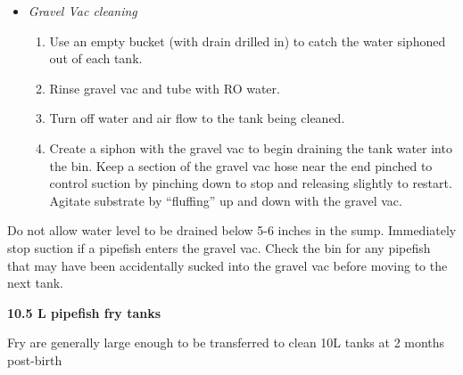 \documentclass[
  letterpaper,
  DIV=11,
  numbers=noendperiod]{scrreprt}
\providecommand{\tightlist}{%
  \setlength{\itemsep}{0pt}\setlength{\parskip}{0pt}}\usepackage{longtable,booktabs,array}
\begin{document}
\begin{itemize}
\item
  \emph{Gravel Vac cleaning}

  \begin{enumerate}
  \def\labelenumi{\arabic{enumi}.}
  \tightlist
  \item
    Use an empty bucket (with drain drilled in) to catch the water
    siphoned out of each tank.
  \item
    Rinse gravel vac and tube with RO water.
  \item
    Turn off water and air flow to the tank being cleaned.
  \item
    Create a siphon with the gravel vac to begin draining the tank water
    into the bin. Keep a section of the gravel vac hose near the end
    pinched to control suction by pinching down to stop and releasing
    slightly to restart. Agitate substrate by ``fluffing'' up and down
    with the gravel vac.
  \end{enumerate}
\end{itemize}

\begin{tcolorbox}[enhanced jigsaw, rightrule=.15mm, title=\textcolor{quarto-callout-warning-color}{\faExclamationTriangle}\hspace{0.5em}{CAUTION}, titlerule=0mm, opacitybacktitle=0.6, toprule=.15mm, bottomrule=.15mm, opacityback=0, left=2mm, colframe=quarto-callout-warning-color-frame, breakable, coltitle=black, colback=white, colbacktitle=quarto-callout-warning-color!10!white, bottomtitle=1mm, leftrule=.75mm, toptitle=1mm, arc=.35mm]

Do not allow water level to be drained below 5-6 inches in the sump.
Immediately stop suction if a pipefish enters the gravel vac. Check the
bin for any pipefish that may have been accidentally sucked into the
gravel vac before moving to the next tank.

\end{tcolorbox}

\textbf{10.5 L pipefish fry tanks}

\begin{tcolorbox}[enhanced jigsaw, rightrule=.15mm, title=\textcolor{quarto-callout-note-color}{\faInfo}\hspace{0.5em}{NOTE}, titlerule=0mm, opacitybacktitle=0.6, toprule=.15mm, bottomrule=.15mm, opacityback=0, left=2mm, colframe=quarto-callout-note-color-frame, breakable, coltitle=black, colback=white, colbacktitle=quarto-callout-note-color!10!white, bottomtitle=1mm, leftrule=.75mm, toptitle=1mm, arc=.35mm]

Fry are generally large enough to be transferred to clean 10L tanks at 2
months post-birth

\end{tcolorbox}
\end{document}
